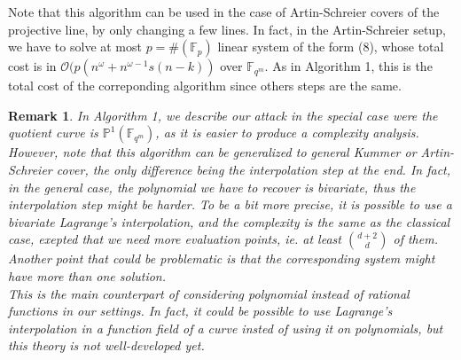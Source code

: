 \documentclass[10pt]{article}
\newtheorem{rq1}[thm]{Remark}
\newcommand{\s}{\vspace{0.3cm}}
\newcommand{\PP}{\mathbb{P}}
\newcommand{\calO}{\mathcal{O}}
\newcommand{\fqm}{\mathbb{F}_{q^m}}
\newcommand{\w}{\omega}
\begin{document}
\s

Note that this algorithm can be used in the case of Artin-Schreier covers of the projective line, by only changing a few lines. In fact, in the Artin-Schreier setup, we have to solve at most $p = \#(\mathbb{F}_p)$ linear system of the form (8), whose total cost is in $\calO(p(n^{\w}+n^{\w-1}s(n-k))$ over $\fqm$. As in Algorithm 1, this is the total cost of the correponding algorithm since others steps are the same.

\s

\begin{rq1} \rm \color{black}
In Algorithm 1, we describe our attack in the special case were the quotient curve is $\PP^1(\fqm)$, as it is easier to produce a complexity analysis. However, note that this algorithm can be generalized to general Kummer or Artin-Schreier cover, the only difference being the interpolation step at the end. In fact, in the general case, the polynomial we have to recover is bivariate, thus the interpolation step might be harder. To be a bit more precise, it is possible to use a bivariate Lagrange's interpolation, and the complexity is the same as the classical case, exepted that we need more evaluation points, ie. at least $\binom{d+2}{d}$ of them. Another point that could be problematic is that the corresponding system might have more than one solution. \\
This is the main counterpart of considering polynomial instead of rational functions in our settings. In fact, it could be possible to use Lagrange's interpolation in a function field of a curve insted of using it on polynomials, but this theory is not well-developed yet.
\end{rq1}
\end{document}
